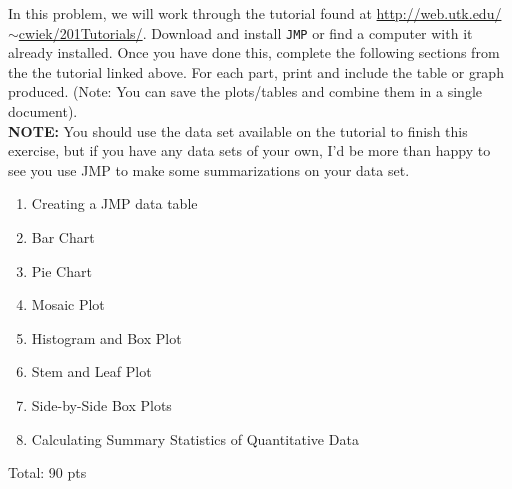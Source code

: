\documentclass[11pt]{article}\usepackage[]{graphicx}\usepackage[]{color}
\begin{document}
\begin{itemize}
   In this problem, we will work through the tutorial found at \href{http://web.utk.edu/~cwiek/201Tutorials/}{http://web.utk.edu/$\sim$cwiek/201Tutorials/}. Download and install \texttt{JMP} or find a computer with it already installed. Once you have done this, complete the following sections from the the tutorial linked above. For each part, print and include the table or graph produced. (Note: You can save the plots/tables and combine them in a single document).\\
\textbf{NOTE:} You should use the data set available on the tutorial to finish this exercise, but if you have any data sets of your own, I'd be more than happy to see you use JMP to make some summarizations on your data set. 

   \begin{enumerate}
      \item Creating a JMP data table
      \item Bar Chart
      \item Pie Chart
      \item Mosaic Plot
      \item Histogram and Box Plot
      \item Stem and Leaf Plot
      \item Side-by-Side Box Plots
      \item Calculating Summary Statistics of Quantitative Data
   \end{enumerate}

Total: 90 pts


















\end{itemize}
\end{document}
